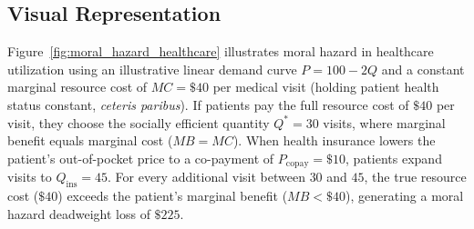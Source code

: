 \documentclass[11pt,letterpaper]{article}
\begin{document}
\subsection*{Visual Representation}
Figure~\ref{fig:moral_hazard_healthcare} illustrates moral hazard in healthcare utilization using an illustrative linear demand curve $P = 100 - 2Q$ and a constant marginal resource cost of $MC = \$40$ per medical visit (holding patient health status constant, \emph{ceteris paribus}). If patients pay the full resource cost of $\$40$ per visit, they choose the socially efficient quantity $Q^* = 30$ visits, where marginal benefit equals marginal cost ($MB = MC$). When health insurance lowers the patient's out-of-pocket price to a co-payment of $P_{\text{copay}} = \$10$, patients expand visits to $Q_{\text{ins}} = 45$. For every additional visit between $30$ and $45$, the true resource cost ($\$40$) exceeds the patient's marginal benefit ($MB < \$40$), generating a moral hazard deadweight loss of $\$225$.
\end{document}
